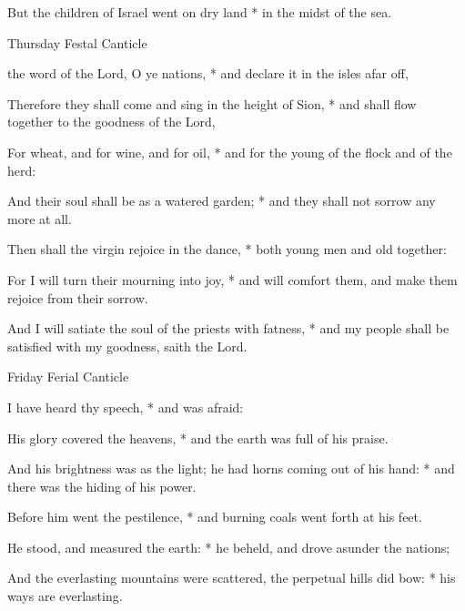 \begin{multicols}{2}
But the children of Israel went on dry land * in the midst of the sea.
\begin{inhead}
Thursday Festal Canticle
\end{inhead}
 the word of the Lord, O ye nations, * and declare it in the isles afar off,\par
{}
Therefore they shall come and sing in the height of Sion, * and shall flow together to the goodness of the Lord,\par
For wheat, and for wine, and for oil, * and for the young of the flock and of the herd:\par
And their soul shall be as a watered garden; * and they shall not sorrow any more at all.\par
Then shall the virgin rejoice in the dance, * both young men and old together:\par
For I will turn their mourning into joy, * and will comfort them, and make them rejoice from their sorrow.\par
And I will satiate the soul of the priests with fatness, * and my people shall be satisfied with my goodness, saith the Lord.
\begin{inhead}
Friday Ferial Canticle
\end{inhead}
 I have heard thy speech, * and was afraid:\par
{}
His glory covered the heavens, * and the earth was full of his praise.\par
And his brightness was as the light; {\dag} he had horns coming out of his hand: * and there was the hiding of his power.\par
Before him went the pestilence, * and burning coals went forth at his feet.\par
He stood, and measured the earth: * he beheld, and drove asunder the nations;\par
And the everlasting mountains were scattered, {\dag} the perpetual hills did bow: * his ways are everlasting.\par

\end{multicols}
